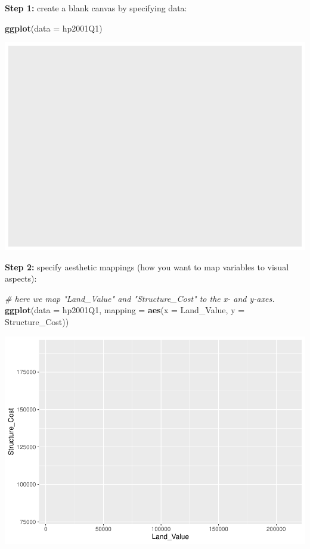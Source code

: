 \documentclass[
]{book}
\newenvironment{Shaded}{\begin{snugshade}}{\end{snugshade}}
\newcommand{\CommentTok}[1]{\textcolor[rgb]{0.56,0.35,0.01}{\textit{#1}}}
\newcommand{\DataTypeTok}[1]{\textcolor[rgb]{0.13,0.29,0.53}{#1}}
\newcommand{\KeywordTok}[1]{\textcolor[rgb]{0.13,0.29,0.53}{\textbf{#1}}}
\newcommand{\NormalTok}[1]{#1}
\begin{document}
\textbf{Step 1:} create a blank canvas by specifying data:

\begin{Shaded}
\begin{Highlighting}[]
\KeywordTok{ggplot}\NormalTok{(}\DataTypeTok{data =}\NormalTok{ hp2001Q1)}
\end{Highlighting}
\end{Shaded}

\includegraphics{R/Rgraphics/figures/unnamed-chunk-157-1.pdf}

\textbf{Step 2:} specify aesthetic mappings (how you want to map variables to visual aspects):

\begin{Shaded}
\begin{Highlighting}[]
\CommentTok{\# here we map "Land\_Value" and "Structure\_Cost" to the x{-} and y{-}axes.}
\KeywordTok{ggplot}\NormalTok{(}\DataTypeTok{data =}\NormalTok{ hp2001Q1, }\DataTypeTok{mapping =} \KeywordTok{aes}\NormalTok{(}\DataTypeTok{x =}\NormalTok{ Land\_Value, }\DataTypeTok{y =}\NormalTok{ Structure\_Cost))}
\end{Highlighting}
\end{Shaded}

\includegraphics{R/Rgraphics/figures/unnamed-chunk-158-1.pdf}
\end{document}
